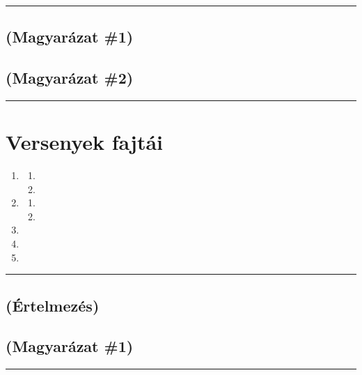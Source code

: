 \documentclass[]{report}
\newenvironment{expl}[0]%
  {\rule{\textwidth}{.2pt}\footnotesize}%
  {\rule{\textwidth}{.2pt}\normalsize}
\begin{document}
\begin{expl}
\section*{(Magyarázat \#1)}


\section*{(Magyarázat \#2)}

\end{expl}

\restoregeometry


\chapter{Versenyek fajtái}

\begin{enumerate}

\item


  \begin{enumerate}
  \item
  
  \item
  
  \end{enumerate}

\item


  \begin{enumerate}
  \item
  
  \item
  
  \end{enumerate}

\item

\item

\item

\end{enumerate}

\begin{expl}
\section*{(Értelmezés)}


\section*{(Magyarázat \#1)}

\end{expl}
\end{document}
